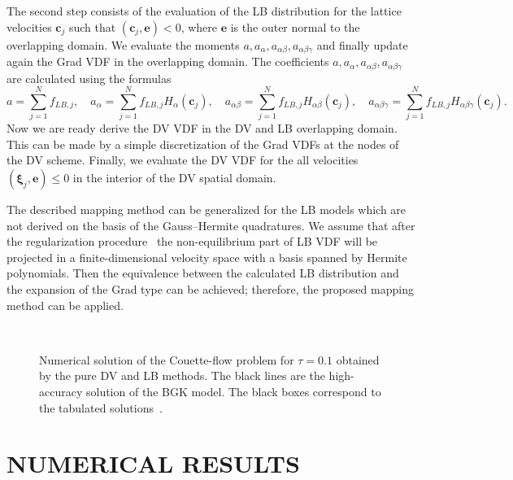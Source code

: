 \documentclass{aip-cp}
\makeatletter
\newenvironment{subfigures}
 {\begin{minipage}{\columnwidth}\def\@captype{figure}\centering}
 {\end{minipage}}
\newcommand{\bxi}{\boldsymbol{\xi}}
\newcommand{\bc}{\boldsymbol{c}}
\makeatother
\begin{document}
The second step consists of the evaluation of the LB distribution for the lattice velocities $\boldsymbol{c}_j$
such that $(\boldsymbol{c}_j,\mathbf{e})<0$, where $\mathbf{e}$ is the outer normal to the overlapping domain.
We evaluate the moments $a, a_{\alpha}, a_{\alpha\beta}, a_{\alpha\beta\gamma}$
and finally update again the Grad VDF in the overlapping domain.
The coefficients $a, a_{\alpha}, a_{\alpha\beta}, a_{\alpha\beta\gamma}$ are calculated using the formulas
$$
a=\sum_{j=1}^N f_{LB,j}, \quad a_{\alpha}=\sum_{j=1}^N f_{LB,j}H_{\alpha}(\bc_j), \quad a_{\alpha\beta}=\sum_{j=1}^N f_{LB,j}H_{\alpha\beta}(\bc_j),
\quad a_{\alpha\beta\gamma}=\sum_{j=1}^N f_{LB,j}H_{\alpha\beta\gamma}(\bc_j).
$$
Now we are ready derive the DV VDF in the DV and LB overlapping domain. This can be made by a simple
discretization of the Grad VDFs at the nodes of the DV scheme. Finally, we evaluate the DV VDF for the all velocities $(\bxi_j,\mathbf{e}) \leq 0$
in the interior of the DV spatial domain.

The described mapping method can be generalized for the LB models which are not derived on the basis of the Gauss--Hermite quadratures.
We assume that after the regularization procedure~\cite{Latt2006, Chen2006}
the non-equilibrium part of LB VDF will be projected in a finite-dimensional velocity space with a basis spanned by Hermite polynomials.
Then the equivalence between the calculated LB distribution and
the expansion of the Grad type can be achieved; therefore, the proposed mapping method can be applied.

\begin{figure}
    \begin{subfigures}
    \centering
    \subfloat[][LB method: D3Q19]{%
        \texttt{[image: d3q19]}}\\
    \subfloat[][LB method: D3Q121]{%
        \texttt{[image: d3q121]}}%
    \subfloat[][LB method: D3Q96]{%
        \texttt{[image: d3v96]}}
    \end{subfigures}
    \caption{
        Numerical solution of the Couette-flow problem for $\tau=0.1$ obtained by the pure DV and LB methods.
        The black lines are the high-accuracy solution of the BGK model.
        The black boxes correspond to the tabulated solutions~\cite{Luo2015, Luo2016}.
    }\label{fig:pure}
\end{figure}

\section{NUMERICAL RESULTS}\label{sec:results}
\end{document}
